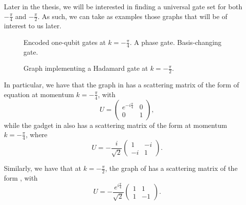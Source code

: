 \documentclass[../thesis-main/thesis-main]{subfiles}
\begin{document}
Later in the thesis, we will be interested in finding a universal gate set for both $-\frac{\pi}{4}$ and $-\frac{\pi}{2}$.  As such, we can take as examples those graphs that will be of interest to us later.   


\begin{figure}
  \centering
  \qquad
   \caption{Encoded one-qubit gates at $k = -\frac{\pi}{4}$.    A phase gate.    Basis-changing gate.}
   \label{fig:reversal}
\end{figure}

\begin{figure}
  \centering
  
  \label{fig:pi_2_had}
  \caption{Graph implementing a Hadamard gate at $k = -\frac{\pi}{2}$.}
\end{figure}


In particular, we have that the graph in  has a scattering matrix of the form of equation  at momentum $k= -\frac{\pi}{4}$, with 
\begin{equation}
  U = \begin{pmatrix}
    e^{- i \frac{\pi}{4}} & 0\\
    0 & 1 
  \end{pmatrix},
\end{equation}
while the gadget in  also has a scattering matrix of the form  at momentum $k=-\frac{\pi}{4}$, where
\begin{equation}
  U = -\frac{i}{\sqrt{2}}\begin{pmatrix}
    1 & -i\\
    -i & 1 
  \end{pmatrix}.
\end{equation}

Similarly, we have that at $k = -\frac{\pi}{2}$, the graph of  has a scattering matrix of the form , with
\begin{equation}
  U = -\frac{e^{i \frac{\pi}{4}}}{\sqrt{2}}\begin{pmatrix}
    1 & 1\\
    1 & -1 
  \end{pmatrix}.
\end{equation}
\end{document}
